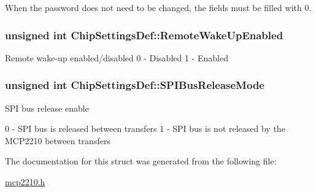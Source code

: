 \-When the password does not need to be changed, the fields must be filled with 0. \hypertarget{struct_chip_settings_def_a5a29397e3fd6793de5d8d348b3b11d22}{
\subsubsection[{\-Remote\-Wake\-Up\-Enabled}]{\setlength{\rightskip}{0pt plus 5cm}unsigned int {\bf \-Chip\-Settings\-Def\-::\-Remote\-Wake\-Up\-Enabled}}}\label{struct_chip_settings_def_a5a29397e3fd6793de5d8d348b3b11d22}
\-Remote wake-\/up enabled/disabled 0 -\/ \-Disabled 1 -\/ \-Enabled \hypertarget{struct_chip_settings_def_abeaf6785170c987a19025a506cf14a8d}{
\subsubsection[{\-S\-P\-I\-Bus\-Release\-Mode}]{\setlength{\rightskip}{0pt plus 5cm}unsigned int {\bf \-Chip\-Settings\-Def\-::\-S\-P\-I\-Bus\-Release\-Mode}}}\label{struct_chip_settings_def_abeaf6785170c987a19025a506cf14a8d}
\-S\-P\-I bus release enable

0 -\/ \-S\-P\-I bus is released between transfers 1 -\/ \-S\-P\-I bus is not released by the \-M\-C\-P2210 between transfers 

\-The documentation for this struct was generated from the following file\-:\begin{DoxyCompactItemize}
\item 
\hyperlink{mcp2210_8h}{mcp2210.\-h}\end{DoxyCompactItemize}
